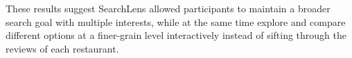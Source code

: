 \documentclass{sigchi}
\begin{document}


These results suggest SearchLens allowed participants to maintain a broader search goal with multiple interests, while at the same time explore and compare different options at a finer-grain level interactively instead of sifting through the reviews of each restaurant.











\end{document}
